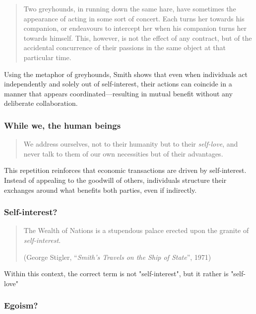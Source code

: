             \begin{quote}
                Two greyhounds, in running down the same hare, have sometimes the appearance of acting in some sort of concert. Each turns her towards his companion, or endeavours to intercept her when his companion turns her towards himself. This, however, is not the effect of any contract, but of the accidental concurrence of their passions in the same object at that particular time.
            \end{quote}

            Using the metaphor of greyhounds, Smith shows that even when individuals act independently and solely out of self-interest, their actions can coincide in a manner that appears coordinated—resulting in mutual benefit without any deliberate collaboration.

        \subsubsection{While we, the human beings}

            \begin{quote}
                We address ourselves, not to their humanity but to their \textit{self-love}, and never talk to them of our own necessities but of their advantages.
            \end{quote}

            This repetition reinforces that economic transactions are driven by self-interest. Instead of appealing to the goodwill of others, individuals structure their exchanges around what benefits both parties, even if indirectly.

        \subsubsection{Self-interest?}

            \begin{quote}
                The Wealth of Nations is a stupendous palace erected upon the granite of \textit{self-interest}.

                (George Stigler, “\textit{Smith’s Travels on the Ship of State}”, 1971)
            \end{quote}

            Within this context, the correct term is not "self-interest", but it rather is "self-love"

        \subsubsection{Egoism?}


